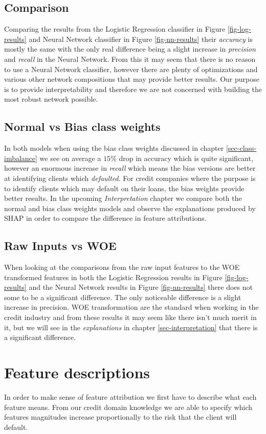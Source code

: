 \subsection{Comparison}
Comparing the results from the Logistic Regression classifier in Figure \ref{fig-log-results} and Neural Network classifier in Figure \ref{fig-nn-results} their \emph{accuracy} is mostly the same with the only real difference being a slight increase in \emph{precision} and \emph{recall} in the Neural Network. From this it may seem that there is no reason to use a Neural Network classifier, however there are plenty of optimizations and various other network compositions that may provide better results. Our purpose is to provide interpretability and therefore we are not concerned with building the most robust network possible.
\subsection{Normal vs Bias class weights}
In both models when using the bias class weights discussed in chapter \ref{sec-class-imbalance} we see on average a $15\%$ drop in accuracy which is quite significant, however an enormous increase in \emph{recall} which means the bias versions are better at identifying clients which \emph{defaulted}. For credit companies where the purpose is to identify clients which may default on their loans, the bias weights provide better results. In the upcoming \emph{Interpretation} chapter we compare both the normal and bias class weights models and observe the explanations produced by SHAP in order to compare the difference in feature attributions. 
\subsection{Raw Inputs vs WOE}
When looking at the comparisons from the raw input features to the WOE transformed features in both the Logistic Regression results in Figure \ref{fig-log-results} and the Neural Network results in Figure \ref{fig-nn-results} there does not some to be a significant difference. The only noticeable difference is a slight increase in precision. WOE transformation are the standard when working in the credit industry and from these results it may seem like there isn't much merit in it, but we will see in the \emph{explanations} in chapter \ref{sec-interpretation} that there is a significant difference.
 \section{Feature descriptions} \label{sect-Feature-Descriptions}
 In order to make sense of feature attribution we first have to describe what each feature means. From our credit domain knowledge we are able to specify which features magnitudes increase proportionally to the risk that the client will default.
 
